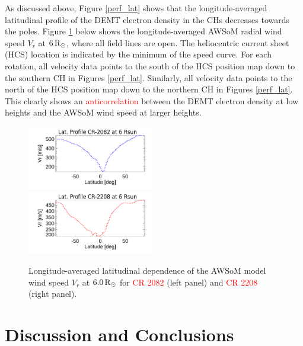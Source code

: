 \documentclass[namedreferences]{solarphysics}
\def\edit#1{\textcolor{Red}{#1}}
\newcommand{\mrsun}{{\rm R_\odot}}
\begin{document}
\begin{article}
{As discussed above, Figure \ref{perf_lat} shows that the longitude-averaged latitudinal profile of the DEMT electron density in the CHs decreases towards the poles. Figure \ref{perf_lon_vr} below shows the longitude-averaged AWSoM radial wind speed $V_r$ at $6\,\mrsun$, where all field lines are open. The heliocentric current sheet (HCS) location is indicated by the minimum of the speed curve. For each rotation, all velocity data points to the south of the HCS position map down to the southern CH in Figures \ref{perf_lat}. Similarly, all velocity data points to the north of the HCS position map down to the northern CH in Figures \ref{perf_lat}. This clearly shows an \edit{anticorrelation} between the DEMT electron density at low heights and the AWSoM wind speed at larger heights.}

\begin{figure}[h!]
\begin{center}
\includegraphics[width=0.495\textwidth]{Perfil_Vr_2082_5995_2.pdf}
\includegraphics[width=0.495\textwidth]{Perfil_Vr_2208_5995_2.pdf}
\caption{{Longitude-averaged latitudinal dependence of the AWSoM model {wind speed $V_r$} at $6.0\,\mrsun$ for \edit{CR 2082} (left panel) and \edit{CR 2208} (right panel).}}
\label{perf_lon_vr}
\end{center}
\end{figure}

\section{{Discussion and Conclusions}}\label{discu} 


\end{article}
\end{document}
